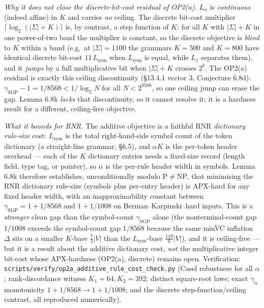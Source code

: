 \documentclass[
]{article}
\begin{document}
\emph{Why it does not close the discrete-bit-cost residual of OP2(a).}
$L_\alpha$ is \emph{continuous} (indeed affine) in $K$ and carries
\emph{no} ceiling. The discrete bit-cost multiplier
$\lceil \log_2(|\Sigma| + K)\rceil$ is, by contrast, a step function of
$K$: for all $K$ with $|\Sigma| + K$ in one power-of-two band the
multiplier is constant, so the discrete objective is \emph{blind} to $K$
within a band (e.g.\ at $|\Sigma| = 1100$ the grammars $K = 500$ and
$K = 800$ have identical discrete bit-cost $11\,L_{\mathrm{sym}}$ when
$L_{\mathrm{sym}}$ is equal, while $L_1$ separates them), and it
\emph{jumps} by a full multiplicative bit when $|\Sigma| + K$ crosses
$2^b$. The OP2(a) residual is exactly this ceiling discontinuity
(\S13.4.1 vector 3, Conjecture 6.8d): $\gamma_{\mathrm{SGP}} - 1 =
1/8568 < 1/\log_2 N$ for all $N < 2^{8568}$, so one ceiling jump can
erase the gap. Lemma 6.8k \emph{lacks} that discontinuity, so it cannot
resolve it; it is a hardness result for a different, ceiling-free
objective.

\emph{What it bounds for RNR.} The additive objective is a faithful RNR
\emph{dictionary rule-size} cost: $L_{\mathrm{sym}}$ is the total
right-hand-side symbol count of the token dictionary (a straight-line
grammar, \S6.5), and $\alpha K$ is the per-token header overhead --- each
of the $K$ dictionary entries needs a fixed-size record (length field,
type tag, or pointer), so $\alpha$ is the per-rule header width in
symbols. Lemma 6.8k therefore establishes, unconditionally modulo
$\mathrm{P}\neq\mathrm{NP}$, that minimising the RNR dictionary
rule-size (symbols plus per-entry header) is APX-hard for any fixed
header width, with an inapproximability constant between
$\gamma_{\mathrm{SGP}} = 1 + 1/8568$ and $1 + 1/1008$ on
Berman--Karpinski--hard inputs. This is a \emph{stronger} clean gap than
the symbol-count $\gamma_{\mathrm{SGP}}$ alone (the nonterminal-count gap
$1/1008$ exceeds the symbol-count gap $1/8568$ because the same minVC
inflation $\Delta$ sits on a smaller $K$-base $\tfrac73|V|$ than the
$L_{\mathrm{sym}}$-base $\tfrac{119}{6}|V|$), and it is ceiling-free ---
but it is a result about the additive dictionary cost, \emph{not} the
multiplicative integer bit-cost whose APX-hardness (OP2(a),
discrete) remains open. Verification:
\texttt{scripts/verify/op2a\_additive\_rule\_cost\_check.py} (Casel
robustness for all $\alpha$; rank-discordance witness $K_1=64,K_2=392$;
distinct square-root laws; exact $\gamma_\alpha$ monotonicity
$1+1/8568 \to 1+1/1008$; and the discrete step-function/ceiling
contrast, all reproduced numerically).
\end{document}
